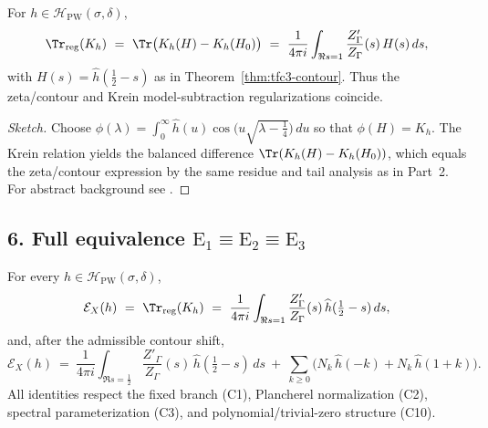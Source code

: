 \begin{theorem}\relax\hspace{0pt}
\label{thm:tfc3-KreinZeta} %
For $h\in\mathcal{H}_{\mathrm{PW}}(\sigma,\delta)$,
\[
\Tr_{\mathrm{reg}}(K_h)\ =\ \Tr\big(K_h(H)-K_h(H_0)\big)\ =\ \frac{1}{4\pi i}\int_{\Re s=1}\frac{Z'_\Gamma}{Z_\Gamma}(s)\,H(s)\,ds,
\]
with $H(s)=\widehat{h}(\tfrac12-s)$ as in Theorem~\ref{thm:tfc3-contour}. Thus the zeta/contour and Krein model-subtraction regularizations coincide.\relax\hspace{0pt}
\end{theorem}

\begin{proof}[Sketch]\relax\hspace{0pt}
Choose $\phi(\lambda)=\int_0^\infty \widehat{h}(u)\cos\!\big(u\sqrt{\lambda-\tfrac14}\big)\,du$ so that $\phi(H)=K_h$. The Krein relation yields the balanced difference $\Tr(K_h(H)-K_h(H_0))$, which equals the zeta/contour expression by the same residue and tail analysis as in Part~2. For abstract background see \cite{Krein,BullaGesztesy}.\relax\hspace{0pt}
\end{proof}

\subsection*{6. Full equivalence \texorpdfstring{$\mathrm{E}_1\equiv\mathrm{E}_2\equiv\mathrm{E}_3$}{E1≡E2≡E3}}\relax\hspace{0pt}
\label{subsec:tfc3-full} %

\begin{theorem}\relax\hspace{0pt}
\label{thm:tfc3-equivalence} %
For every $h\in\mathcal{H}_{\mathrm{PW}}(\sigma,\delta)$,
\[
\mathcal{E}_X(h)\ =\ \Tr_{\mathrm{reg}}(K_h)\ =\ \frac{1}{4\pi i}\int_{\Re s=1}\frac{Z'_\Gamma}{Z_\Gamma}(s)\,\widehat{h}(\tfrac12-s)\,ds,
\]
and, after the admissible contour shift,
\[
\mathcal{E}_X(h)\ =\ \frac{1}{4\pi i}\int_{\Re s=\frac12}\frac{Z'_\Gamma}{Z_\Gamma}(s)\,\widehat{h}(\tfrac12-s)\,ds\ +\ \sum_{k\ge0}\big(N_k\,\widehat{h}(-k)+N_k\,\widehat{h}(1+k)\big).
\]
All identities respect the fixed branch (C1), Plancherel normalization (C2), spectral parameterization (C3), and polynomial/trivial-zero structure (C10).\relax\hspace{0pt}
\end{theorem}

